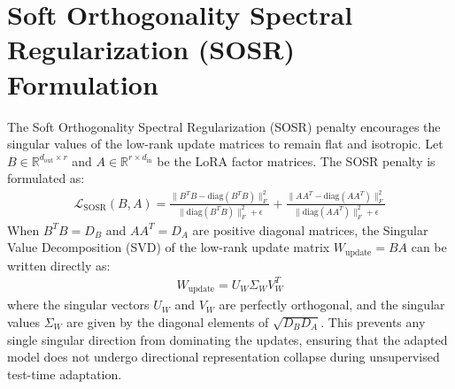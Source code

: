\documentclass{article}
\theoremstyle{plain}
\theoremstyle{definition}
\theoremstyle{remark}
\begin{document}
\section{Soft Orthogonality Spectral Regularization (SOSR) Formulation}
The Soft Orthogonality Spectral Regularization (SOSR) penalty encourages the singular values of the low-rank update matrices to remain flat and isotropic. Let $B \in \mathbb{R}^{d_{\text{out}} \times r}$ and $A \in \mathbb{R}^{r \times d_{\text{in}}}$ be the LoRA factor matrices. The SOSR penalty is formulated as:
\begin{align}
    \mathcal{L}_{\text{SOSR}}(B, A) = \frac{\|B^T B - \text{diag}(B^T B)\|_F^2}{\|\text{diag}(B^T B)\|_F^2 + \epsilon} + \frac{\|A A^T - \text{diag}(A A^T)\|_F^2}{\|\text{diag}(A A^T)\|_F^2 + \epsilon}
\end{align}
When $B^T B = D_B$ and $A A^T = D_A$ are positive diagonal matrices, the Singular Value Decomposition (SVD) of the low-rank update matrix $W_{\text{update}} = B A$ can be written directly as:
\begin{align}
    W_{\text{update}} = U_W \Sigma_W V_W^T
\end{align}
where the singular vectors $U_W$ and $V_W$ are perfectly orthogonal, and the singular values $\Sigma_W$ are given by the diagonal elements of $\sqrt{D_B D_A}$. This prevents any single singular direction from dominating the updates, ensuring that the adapted model does not undergo directional representation collapse during unsupervised test-time adaptation.
\end{document}
